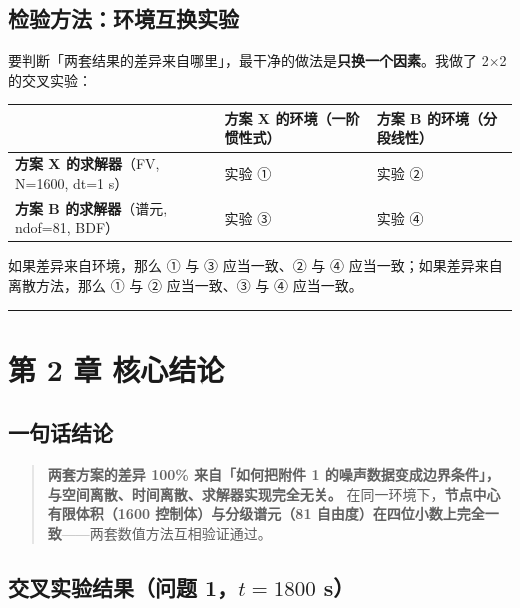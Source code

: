\subsection{检验方法：环境互换实验}


要判断「两套结果的差异来自哪里」，最干净的做法是\textbf{只换一个因素}。我做了 2$\times$2 的交叉实验：


\begin{center}
\small
\begin{tabular}{lll}
\toprule
 & 方案 X 的环境（一阶惯性式） & 方案 B 的环境（分段线性） \\
\midrule
\textbf{方案 X 的求解器}（FV, N=1600, dt=1 s） & 实验 ① & 实验 ② \\
\textbf{方案 B 的求解器}（谱元, ndof=81, BDF） & 实验 ③ & 实验 ④ \\
\bottomrule
\end{tabular}
\end{center}


如果差异来自环境，那么 ① 与 ③ 应当一致、② 与 ④ 应当一致；如果差异来自离散方法，那么 ① 与 ② 应当一致、③ 与 ④ 应当一致。


\vspace{1mm}\hrule\vspace{1mm}


\section{第 2 章 核心结论}


\subsection{一句话结论}


\begin{quote}
\textbf{两套方案的差异 100\% 来自「如何把附件 1 的噪声数据变成边界条件」，与空间离散、时间离散、求解器实现完全无关。}  在同一环境下，\textbf{节点中心有限体积（1600 控制体）与分级谱元（81 自由度）在四位小数上完全一致}——两套数值方法互相验证通过。
\end{quote}


\subsection{交叉实验结果（问题 1，$t=1800$ s）}



